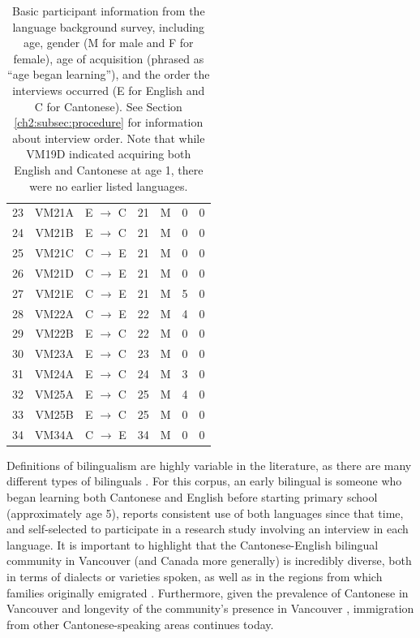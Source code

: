 \begin{table}[!htbp]
\begin{center}
\begin{tabular}{ccccccc}
  23  & VM21A & E $\rightarrow$ C & 21  & M & 0   & 0 \\
  24  & VM21B & E $\rightarrow$ C & 21  & M & 0   & 0 \\
  25  & VM21C & C $\rightarrow$ E & 21  & M & 0   & 0 \\
  26  & VM21D & C $\rightarrow$ E & 21  & M & 0   & 0 \\
  27  & VM21E & C $\rightarrow$ E & 21  & M & 5   & 0 \\
  28  & VM22A & C $\rightarrow$ E & 22  & M & 4   & 0 \\
  29  & VM22B & E $\rightarrow$ C & 22  & M & 0   & 0 \\
  30  & VM23A & E $\rightarrow$ C & 23  & M & 0   & 0 \\
  31  & VM24A & E $\rightarrow$ C & 24  & M & 3   & 0 \\
  32  & VM25A & E $\rightarrow$ C & 25  & M & 4   & 0 \\
  33  & VM25B & E $\rightarrow$ C & 25  & M & 0   & 0 \\
  34  & VM34A & C $\rightarrow$ E & 34  & M & 0   & 0 \\
  \bottomrule
  
  \end{tabular}
  \caption{Basic participant information from the language background survey, including age, gender (M for male and F for female), age of acquisition (phrased as ``age began learning''), and the order the interviews occurred (E for English and C for Cantonese). See Section \ref{ch2:subsec:procedure} for information about interview order. Note that while VM19D indicated acquiring both English and Cantonese at age 1, there were no earlier listed languages.}
  \label{ch2:tab:participants}
  \end{center}
  \end{table}

Definitions of bilingualism are highly variable in the literature, as there are many different types of bilinguals \citep{amengual_2017_type}. For this corpus, an early bilingual is someone who began learning both Cantonese and English before starting primary school (approximately age 5), reports consistent use of both languages since that time, and self-selected to participate in a research study involving an interview in each language. It is important to highlight that the Cantonese-English bilingual community in Vancouver (and Canada more generally) is incredibly diverse, both in terms of dialects or varieties spoken, as well as in the regions from which families originally emigrated \citep{yu_2013_diaspora}. Furthermore, given the prevalence of Cantonese in Vancouver \citep{statistics_2017_proportion} and longevity of the community's presence in Vancouver \citep{yu_2013_diaspora}, immigration from other Cantonese-speaking areas continues today. 

